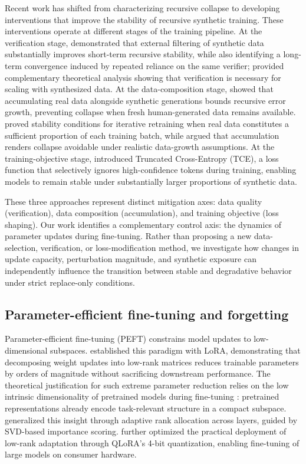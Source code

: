 \documentclass[a4paper,fleqn]{cas-dc}
\begin{document}
Recent work has shifted from characterizing recursive collapse to developing
interventions that improve the stability of recursive synthetic training. These
interventions operate at different stages of the training pipeline.
At the verification stage, \citet{yi2025} demonstrated that external filtering
of synthetic data substantially improves short-term recursive stability, while
also identifying a long-term convergence induced by repeated reliance on the
same verifier; \citet{feng2025verification} provided complementary theoretical
analysis showing that verification is necessary for scaling with synthesized
data. At the data-composition stage, \citet{gerstgrasser2024} showed
that accumulating real data alongside synthetic generations bounds recursive
error growth, preventing collapse when fresh human-generated data remains
available. \citet{bertrand2024stability} proved stability conditions for
iterative retraining when real data constitutes a sufficient proportion of each
training batch, while \citet{gerstgrasser2024} argued that accumulation
renders collapse avoidable under realistic data-growth assumptions. At the
training-objective stage, \citet{zibakhsh2024} introduced
Truncated Cross-Entropy (TCE), a loss function that selectively ignores
high-confidence tokens during training, enabling models to remain stable under
substantially larger proportions of synthetic data.

These three approaches represent distinct mitigation axes: data quality
(verification), data composition (accumulation), and training objective (loss
shaping). Our work identifies a complementary control axis: the dynamics of
parameter updates during fine-tuning. Rather than proposing a new
data-selection, verification, or loss-modification method, we investigate how
changes in update capacity, perturbation magnitude, and synthetic exposure
can independently influence the transition between stable and degradative
behavior under strict replace-only conditions.

\subsection{Parameter-efficient fine-tuning and forgetting}

Parameter-efficient fine-tuning (PEFT) constrains model updates to
low-dimensional subspaces. \citet{hu2022} established this paradigm with LoRA,
demonstrating that decomposing weight updates into low-rank matrices reduces
trainable parameters by orders of magnitude without sacrificing downstream
performance. The theoretical justification for such extreme parameter reduction
relies on the low intrinsic dimensionality of pretrained models during
fine-tuning \citep{aghajanyan2021}: pretrained representations already encode
task-relevant structure in a compact subspace. \citet{zhang2023adalora}
generalized this insight through adaptive rank allocation across layers, guided
by SVD-based importance scoring. \citet{dettmers2023} further optimized the
practical deployment of low-rank adaptation through QLoRA's 4-bit quantization,
enabling fine-tuning of large models on consumer hardware.
\end{document}
